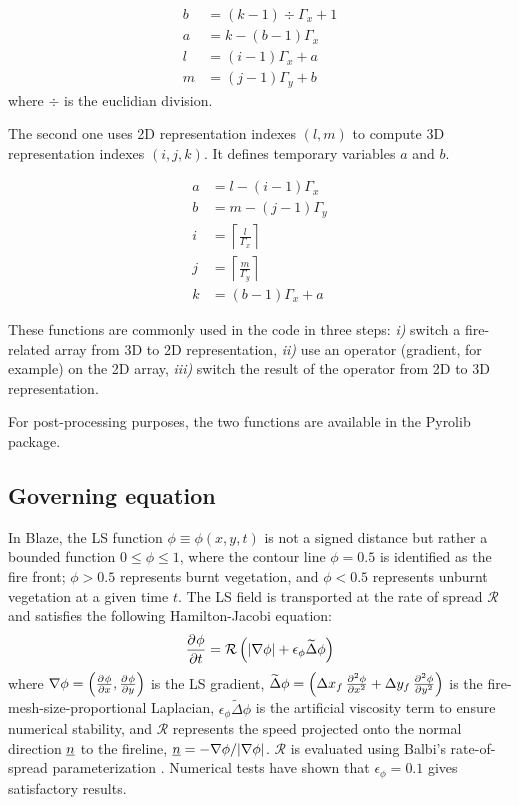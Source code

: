 \begin{align}
  b &= (k-1) \div \Gamma_x + 1 \nonumber \\
  a &= k - (b-1)\Gamma_x \nonumber \\
  l &= (i-1)\Gamma_x + a \\
  m &= (j-1)\Gamma_y + b 
\end{align}
where $\div$ is the euclidian division.

\medskip

The second one uses 2D representation indexes $(l, m)$ to compute 3D representation indexes $(i,j,k)$. It defines temporary variables $a$ and $b$.

\begin{align}
	a &= l - (i-1)\Gamma_x \nonumber \\
	b &= m - (j-1)\Gamma_y \nonumber \\
	i &= \left \lceil \frac{l}{\Gamma_x} \right \rceil \\
	j &= \left \lceil \frac{m}{\Gamma_y} \right \rceil \\
	k &= (b-1)\Gamma_x + a
\end{align}

These functions are commonly used in the code in three steps: \textit{i)} switch a fire-related array from 3D to 2D representation, \textit{ii)} use an operator (gradient, for example) on the 2D array, \textit{iii)} switch the result of the operator from 2D to 3D representation.

For post-processing purposes, the two functions are available in the Pyrolib package.

\subsection{Governing equation}
\label{sec:governingeq}

In Blaze, the LS function $\phi \equiv \phi(x,y,t)$ is not a signed distance but rather a bounded function $0 \leqslant \phi \leqslant 1$, where the contour line $\phi = 0.5$ is identified as the fire front; $\phi > 0.5$ represents burnt vegetation, and $\phi < 0.5$ represents unburnt vegetation at a given time $t$. The LS field is transported at the rate of spread $\mathcal R$ and satisfies the following Hamilton-Jacobi equation:
\begin{equation}
\dpar{\phi}{t}{} = \mathcal R \left (|\nabla \phi | + \epsilon_\phi \widetilde \Delta \phi \right )
\label{eq:lveq}
\end{equation}
where $\nabla \phi = \left ( \dpar{\phi}{x}{}, \dpar{\phi}{y}{} \right )$ is the LS gradient, $\widetilde \Delta \phi = \left ( \Delta x_f\,\dpar{\phi}{x^2}{2} + \Delta y_f\,\dpar{\phi}{y^2}{2} \right )$ is the fire-mesh-size-proportional Laplacian, $\epsilon_\phi \widetilde \Delta \phi$ is the artificial viscosity term to ensure numerical stability, and $\mathcal{R}$ represents the speed projected onto the normal direction $\uvec n$ to the fireline, 
$\uvec n = -\nabla \phi/|\nabla \phi |$. $\mathcal{R}$ is evaluated using Balbi's rate-of-spread parameterization \citep{Santoni2011}.
Numerical tests have shown that $\epsilon_\phi = 0.1$ gives satisfactory results.

